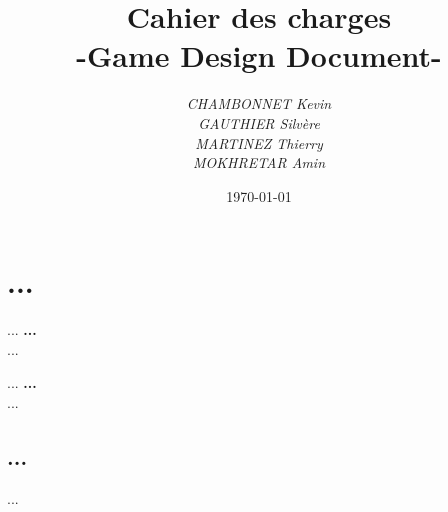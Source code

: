 \documentclass[a4paper]{article}
\title{Cahier des charges\\-Game Design Document-}
\author{\emph{CHAMBONNET Kevin}\\\emph{GAUTHIER Silvère}\\\emph{MARTINEZ Thierry}\\\emph{MOKHRETAR Amin}}
\date{\today}
\begin{document}
\maketitle

\section*{...}

...    \textbf{ ... }\\...
\bigskip

...    \textbf{ ... }\\...

\subsection*{...}
...
\end{document}
